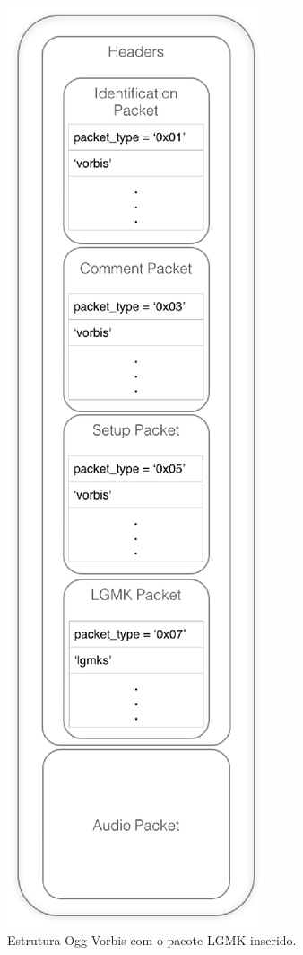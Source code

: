  \begin{figure}[ht]
	\centering
		\includegraphics[keepaspectratio=true,scale=0.8]{figuras/newformat.eps}
	\caption{Estrutura Ogg Vorbis com o pacote LGMK inserido.}
	\label{newformat}
\end{figure}

